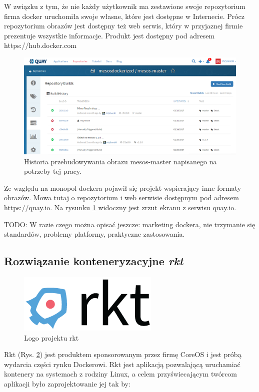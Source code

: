 \documentclass[10pt,a4paper,titlepage,twoside]{report}
\begin{document}
W związku z tym, że nie każdy użytkownik ma zestawione swoje repozytorium firma docker uruchomiła swoje własne, które jest dostępne w Internecie. Prócz repozytorium obrazów jest dostępny też web serwis, który w przyjaznej firmie prezentuje wszystkie informacje. Produkt jest dostępny pod adresem https://hub.docker.com

\begin{figure}[!h]
	\centering
	\includegraphics[scale=1]{pics/quay.png}
	\caption{Historia przebudowywania obrazu mesos-master napisanego na potrzeby tej pracy.}
	\label{quay_io}
\end{figure}

Ze względu na monopol dockera pojawił się projekt wspierający inne formaty obrazów. Mowa tutaj o repozytorium i web serwisie dostępnym pod adresem https://quay.io. Na rysunku \ref{quay_io} widoczny jest zrzut ekranu z serwisu quay.io.

TODO: W razie czego można opisać jeszcze: marketing dockera, nie trzymanie się standardów, problemy platformy, praktyczne zastosowania.

\subsection{Rozwiązanie konteneryzacyjne \textit{rkt}}

\begin{figure}[!h]
	\centering
	\includegraphics[scale=1]{pics/rkt-horizontal-color.png}
	\caption{Logo projektu rkt}
	\label{rkt_logo}
\end{figure}

Rkt (Rys. \ref{rkt_logo}) jest produktem sponsorowanym przez firmę CoreOS i jest próbą wydarcia części rynku Dockerowi. Rkt jest aplikacją pozwalającą uruchamiać kontenery na systemach z rodziny Linux, a celem przyświecającym twórcom aplikacji było zaprojektowanie jej tak by:
\end{document}
